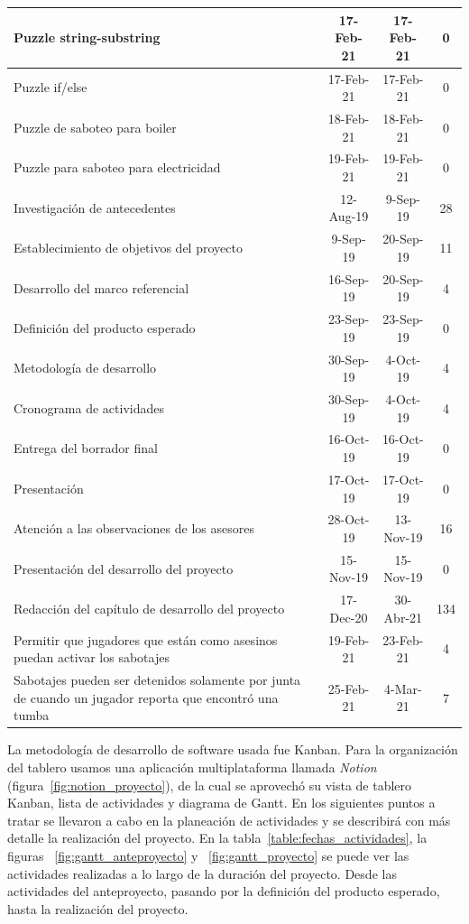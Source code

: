 \begin{longtable}[c]{|m{5cm}|c|c|c|}
\hline
Puzzle string-substring                            & 17-Feb-21 & 17-Feb-21 & 0      \\
\hline
Puzzle if/else                                     & 17-Feb-21 & 17-Feb-21 & 0      \\
\hline
Puzzle de saboteo para boiler                      & 18-Feb-21 & 18-Feb-21 & 0      \\
\hline
Puzzle para saboteo para electricidad              & 19-Feb-21 & 19-Feb-21 & 0      \\
\hline
Investigación de antecedentes                      & 12-Aug-19 & 9-Sep-19  & 28     \\
\hline
Establecimiento de objetivos del proyecto          & 9-Sep-19  & 20-Sep-19 & 11     \\
\hline
Desarrollo del marco referencial                   & 16-Sep-19 & 20-Sep-19 & 4      \\
\hline
Definición del producto esperado                   & 23-Sep-19 & 23-Sep-19 & 0      \\
\hline
Metodología de desarrollo                          & 30-Sep-19 & 4-Oct-19  & 4      \\
\hline
Cronograma de actividades                          & 30-Sep-19 & 4-Oct-19  & 4      \\
\hline
Entrega del borrador final                         & 16-Oct-19 & 16-Oct-19 & 0      \\
\hline
Presentación                                       & 17-Oct-19 & 17-Oct-19 & 0      \\
\hline
Atención a las observaciones de los asesores       & 28-Oct-19 & 13-Nov-19 & 16     \\
\hline
Presentación del desarrollo del proyecto           & 15-Nov-19 & 15-Nov-19 & 0      \\
\hline
Redacción del capítulo de desarrollo del proyecto  & 17-Dec-20 & 30-Abr-21 & 134      \\
\hline
Permitir que jugadores que están como asesinos puedan activar los sabotajes & 19-Feb-21 & 23-Feb-21 & 4 \\
\hline
Sabotajes pueden ser detenidos solamente por junta de cuando un jugador reporta que encontró una tumba & 25-Feb-21 & 4-Mar-21 & 7 \\
\hline
\end{longtable}

La metodología de desarrollo de software usada fue Kanban. Para la organización del tablero usamos una aplicación multiplataforma llamada  \textit{Notion} (figura~\ref{fig:notion_proyecto}), de la cual se aprovechó su vista de tablero Kanban, lista de actividades y diagrama de Gantt. En los siguientes puntos a tratar se llevaron a cabo en la planeación de actividades y se describirá con más detalle la realización del proyecto. En la tabla~\ref{table:fechas_actividades}, la figuras ~\ref{fig:gantt_anteproyecto} y ~\ref{fig:gantt_proyecto} se puede ver las actividades realizadas a lo largo de la duración del proyecto. Desde las actividades del anteproyecto, pasando por la definición del producto esperado, hasta la realización del proyecto. 


